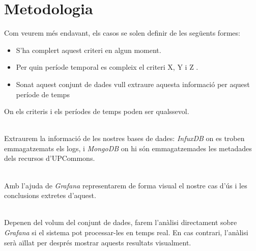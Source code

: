 \section{Metodologia}\label{sec:analysis-visualization-methodology}

\noindent
Com veurem més endavant, els casos se solen definir de les següents formes:

\begin{itemize}
    \item S’ha complert aquest criteri en algun moment.
    \item Per quin període temporal es compleix el criteri X, Y i Z .
    \item Sonat aquest conjunt de dades vull extraure aquesta informació per aquest període de temps
\end{itemize}

\noindent
On els criteris i els períodes de temps poden ser qualssevol.

\noindent \\
Extraurem la informació de les nostres bases de dades: \textit{InfuxDB} on es troben emmagatzemats els logs, i \textit{MongoDB} on hi són emmagatzemades les metadades dels recursos d’UPCommons.

\noindent \\
Amb l’ajuda de \textit{Grafana} representarem de forma visual el nostre cas d’ús i les conclusions extretes d’aquest.

\noindent \\
Depenen del volum del conjunt de dades,  farem l’anàlisi directament sobre \textit{Grafana} si el sistema pot processar-les en temps real.
En cas contrari, l’anàlisi serà aïllat per després mostrar aquests resultats visualment.
